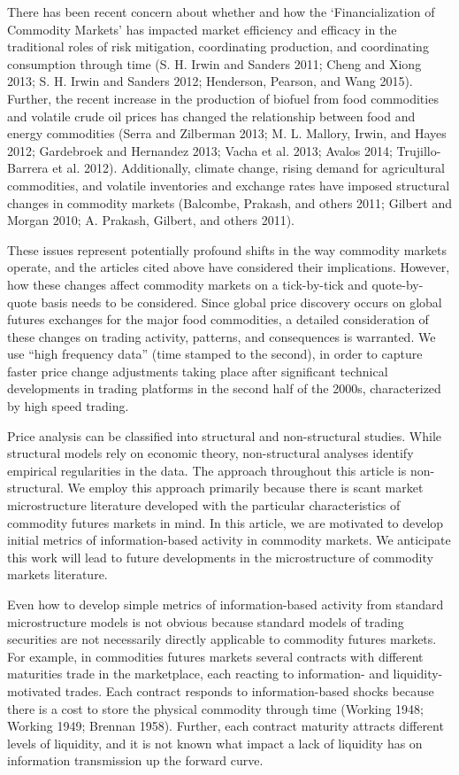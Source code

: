 \documentclass[review,12pt]{elsarticle}
\begin{document}
There has been recent concern about whether and how the
`Financialization of Commodity Markets' has impacted market efficiency
and efficacy in the traditional roles of risk mitigation, coordinating
production, and coordinating consumption through time (S. H. Irwin and
Sanders 2011; Cheng and Xiong 2013; S. H. Irwin and Sanders 2012;
Henderson, Pearson, and Wang 2015). Further, the recent increase in the
production of biofuel from food commodities and volatile crude oil
prices has changed the relationship between food and energy commodities
(Serra and Zilberman 2013; M. L. Mallory, Irwin, and Hayes 2012;
Gardebroek and Hernandez 2013; Vacha et al. 2013; Avalos 2014;
Trujillo-Barrera et al. 2012). Additionally, climate change, rising
demand for agricultural commodities, and volatile inventories and
exchange rates have imposed structural changes in commodity markets
(Balcombe, Prakash, and others 2011; Gilbert and Morgan 2010; A.
Prakash, Gilbert, and others 2011).

These issues represent potentially profound shifts in the way commodity
markets operate, and the articles cited above have considered their
implications. However, how these changes affect commodity markets on a
tick-by-tick and quote-by-quote basis needs to be considered. Since
global price discovery occurs on global futures exchanges for the major
food commodities, a detailed consideration of these changes on trading
activity, patterns, and consequences is warranted. We use ``high
frequency data'' (time stamped to the second), in order to capture
faster price change adjustments taking place after significant technical
developments in trading platforms in the second half of the 2000s,
characterized by high speed trading.

Price analysis can be classified into structural and non-structural
studies. While structural models rely on economic theory, non-structural
analyses identify empirical regularities in the data. The approach
throughout this article is non-structural. We employ this approach
primarily because there is scant market microstructure literature
developed with the particular characteristics of commodity futures
markets in mind. In this article, we are motivated to develop initial
metrics of information-based activity in commodity markets. We
anticipate this work will lead to future developments in the
microstructure of commodity markets literature.

Even how to develop simple metrics of information-based activity from
standard microstructure models is not obvious because standard models of
trading securities are not necessarily directly applicable to commodity
futures markets. For example, in commodities futures markets several
contracts with different maturities trade in the marketplace, each
reacting to information- and liquidity-motivated trades. Each contract
responds to information-based shocks because there is a cost to store
the physical commodity through time (Working 1948; Working 1949; Brennan
1958). Further, each contract maturity attracts different levels of
liquidity, and it is not known what impact a lack of liquidity has on
information transmission up the forward curve.
\end{document}
